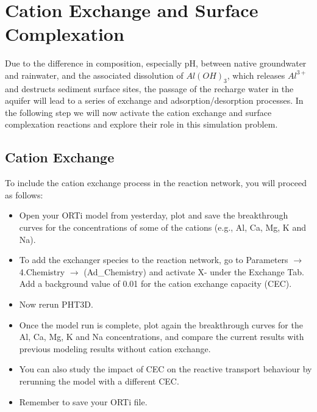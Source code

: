 \section[Cation Exchange and Surface Complexation]{Cation Exchange and Surface Complexation}

Due to the difference in composition, especially pH, between native groundwater and rainwater, and the associated dissolution of $Al(OH)_3$, which releases $Al^{3+}$ and destructs sediment surface sites, the passage of the recharge water in the aquifer will lead to a series of exchange and adsorption/desorption processes. In the following step we will now activate the cation exchange and surface complexation reactions and explore their role in this simulation problem.

\subsection[Cation exchange]{Cation Exchange}
To include the cation exchange process in the reaction network, you will proceed as follows:

\begin{itemize}

\item Open your ORTi model from yesterday, plot and save the breakthrough curves for the concentrations of some of the cations (e.g., Al, Ca, Mg, K and Na). 

\item To add the exchanger species to the reaction network, go to {\color{blue}Parameters} 
$\rightarrow$ {\color{blue}4.Chemistry}  
$\rightarrow$ {\color{blue} (Ad\_Chemistry)} 
and activate X- under the Exchange Tab. 
Add a background value of 0.01 for the cation exchange capacity (CEC).

\item Now rerun PHT3D.

\item Once the model run is complete, plot again the breakthrough curves for the Al, Ca, Mg, K and Na concentrations, and compare the current results with previous modeling results without cation exchange.

\item You can also study the impact of CEC on the reactive transport behaviour by rerunning the model with a different CEC.

\item Remember to save your ORTi file.

\end{itemize}

